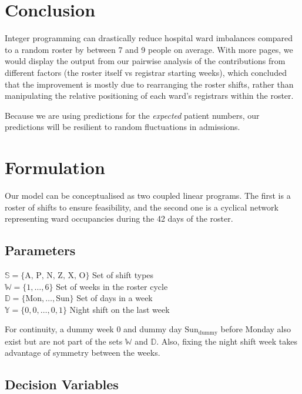 \documentclass[a4paper]{article}
\begin{document}
\section{Conclusion}

Integer programming can drastically reduce hospital ward imbalances compared to a random roster by between 7 and 9 people on average. With more pages, we would display the output from our pairwise analysis of the contributions from different factors (the roster itself vs registrar starting weeks), which concluded that the improvement is mostly due to rearranging the roster shifts, rather than manipulating the relative positioning of each ward's registrars within the roster.

Because we are using predictions for the \emph{expected} patient numbers, our predictions will be resilient to random fluctuations in admissions.

\newpage
\appendix
\section{Formulation}

Our model can be conceptualised as two coupled linear programs. The first is a roster of shifts to ensure feasibility, and the second one is a cyclical network representing ward occupancies during the 42 days of the roster.

\subsection{Parameters}
\begin{multicols}{2}
\noindent


$\mathbb{S} = \{\text{A, P, N, Z, X, O}\}$ \dotfill Set of shift types\\
$\mathbb{W} = \{1, \dots, 6\}$ \dotfill Set of weeks in the roster cycle\\
$\mathbb{D} = \{\text{Mon},\dots,\text{Sun}\}$ \dotfill Set of days in a week\\
$\mathbb{Y}  = \{0, 0,\dots, 0, 1\}$ \dotfill Night shift on the last week

For continuity, a dummy week $0$ and dummy day $\text{Sun}_\text{dummy}$ before Monday also exist but are not part of the sets $\mathbb{W}$ and $\mathbb{D}$. Also, fixing the night shift week takes advantage of symmetry between the weeks.
\end{multicols}
\subsection{Decision Variables}
\end{document}
